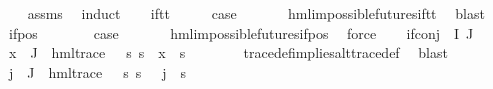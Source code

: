\begin{isabellebody}
%
\isadelimproof
\ \ %
\endisadelimproof
%
\isatagproof
{}\isamarkupfalse%
\ assms\ \isamarkupfalse%
\ induct\isanewline
\ \ \isamarkupfalse%
\ if{\isacharunderscore}{\kern0pt}tt\isanewline
\ \ \isamarkupfalse%
\ \isamarkupfalse%
\ {\isacharquery}{\kern0pt}case\ \isanewline
\ \ \ \ \isamarkupfalse%
\ hml{\isacharunderscore}{\kern0pt}impossible{\isacharunderscore}{\kern0pt}futures{\isachardot}{\kern0pt}if{\isacharunderscore}{\kern0pt}tt\ \isamarkupfalse%
\ blast\isanewline
{}\isamarkupfalse%
\isanewline
\ \ \isamarkupfalse%
\ {\isacharparenleft}{\kern0pt}if{\isacharunderscore}{\kern0pt}pos\ {\isasymphi}\ {\isasymalpha}{\isacharparenright}{\kern0pt}\isanewline
\ \ \isamarkupfalse%
\ \isamarkupfalse%
\ {\isacharquery}{\kern0pt}case\ \isanewline
\ \ \ \ \isamarkupfalse%
\ hml{\isacharunderscore}{\kern0pt}impossible{\isacharunderscore}{\kern0pt}futures{\isachardot}{\kern0pt}if{\isacharunderscore}{\kern0pt}pos\ \isamarkupfalse%
\ force\isanewline
{}\isamarkupfalse%
\isanewline
\ \ \isamarkupfalse%
\ {\isacharparenleft}{\kern0pt}if{\isacharunderscore}{\kern0pt}conj\ {\isasymPhi}\ I\ J{\isacharparenright}{\kern0pt}\isanewline
\ \ \isamarkupfalse%
\ {\isachardoublequoteopen}{\isasymforall}x\ {\isasymin}\ {\isasymPhi}{\isacharbackquote}{\kern0pt}J{\isachardot}{\kern0pt}\ {\isacharparenleft}{\kern0pt}{\isasymexists}{\isasympsi}{\isachardot}{\kern0pt}\ hml{\isacharunderscore}{\kern0pt}trace\ {\isasympsi}\ {\isasymand}\ {\isacharparenleft}{\kern0pt}{\isasymforall}s{\isachardot}{\kern0pt}\ s\ {\isasymTurnstile}\ x\ {\isasymlongleftrightarrow}\ s\ {\isasymTurnstile}\ {\isasympsi}{\isacharparenright}{\kern0pt}{\isacharparenright}{\kern0pt}{\isachardoublequoteclose}\isanewline
\ \ \ \ \isamarkupfalse%
\ trace{\isacharunderscore}{\kern0pt}def{\isacharunderscore}{\kern0pt}implies{\isacharunderscore}{\kern0pt}alt{\isacharunderscore}{\kern0pt}trace{\isacharunderscore}{\kern0pt}def\ \isamarkupfalse%
\ blast\ \isanewline
\ \ \isamarkupfalse%
\ {\isachardoublequoteopen}{\isasymforall}j\ {\isasymin}\ J{\isachardot}{\kern0pt}\ {\isacharparenleft}{\kern0pt}{\isasymexists}{\isasympsi}{\isachardot}{\kern0pt}\ hml{\isacharunderscore}{\kern0pt}trace\ {\isasympsi}\ {\isasymand}\ {\isacharparenleft}{\kern0pt}{\isasymforall}s{\isachardot}{\kern0pt}\ s\ {\isasymTurnstile}\ {\isasymPhi}\ j\ {\isasymlongleftrightarrow}\ s\ {\isasymTurnstile}\ {\isasympsi}{\isacharparenright}{\kern0pt}{\isacharparenright}{\kern0pt}{\isachardoublequoteclose}\isanewline

\end{isabellebody}
